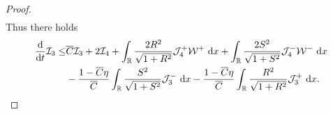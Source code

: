 \documentclass[11pt,reqno]{article}
\newcommand{\fr}{\frac}
\numberwithin{equation}{section}
\begin{document}
\begin{proof}
\begin{align}
\end{align}
Thus there holds
\begin{align}\label{6.35e}
\begin{split}
\fr{{\rm d}}{{\rm d}t}\mathcal{I}_3
\leq &\overline{C}\mathcal{I}_3  +2\mathcal{I}_4  +\int_{\mathbb{R}}  \fr{2R^2}{\sqrt{1+R^2}}\mathcal{J}_{4}^+\mathcal{W}^+\ {\rm d}x  +\int_{\mathbb{R}}  \fr{2S^2}{\sqrt{1+S^2}}\mathcal{J}_{4}^-\mathcal{W}^-\ {\rm d}x  \\ &-\fr{1-\overline{C}\eta}{\overline{C}}\int_{\mathbb{R}}  \fr{S^2}{\sqrt{1+S^2}} \mathcal{J}_{3}^-\ {\rm d}x -\fr{1-\overline{C}\eta}{\overline{C}}\int_{\mathbb{R}}  \fr{R^2}{\sqrt{1+R^2}} \mathcal{J}_{3}^+\ {\rm d}x.
\end{split}
\end{align}




\end{proof}
\end{document}
